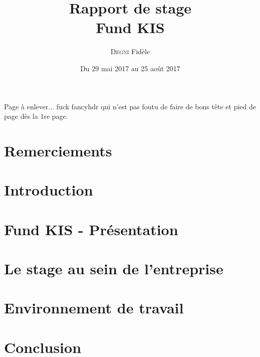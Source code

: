 \documentclass[a4paper, 12pt]{article}
\author{\textsc{Degni} Fidèle}
\date{Du 29 mai 2017 au 25 août 2017}
\title{Rapport de stage \\ Fund KIS}
\begin{document}
\maketitle
\thispagestyle{empty}

\newpage %
{\color{white}
Page à enlever... fuck fancyhdr qui n'est pas foutu de faire de bons tête et pied de page dès la 1re page.
}

\newpage
\setcounter{page}{1} %
\section*{Remerciements}


\newpage
\renewcommand{\contentsname}{Sommaire} %
\tableofcontents

\newpage
\section*{Introduction} %



\newpage
\section{Fund KIS - Présentation}



\vspace{1.5cm}
\section{Le stage au sein de l'entreprise}



\vspace{1.5cm}
\section{Environnement de travail}



\newpage
\section*{Conclusion}

\end{document}
